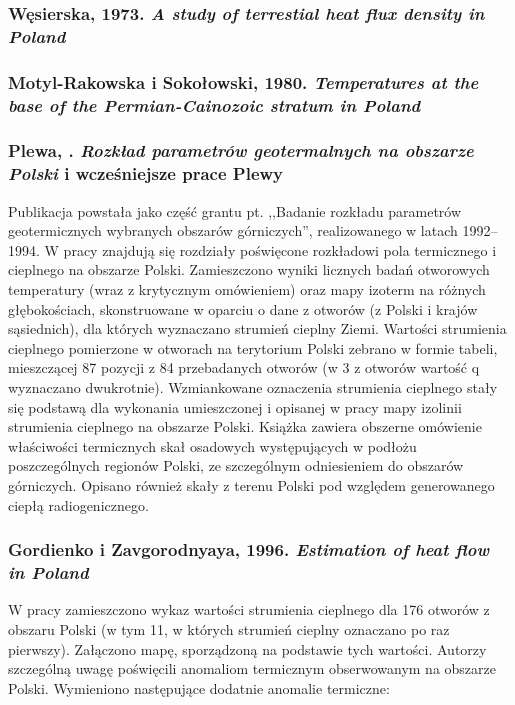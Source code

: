 \documentclass[11.5pt,twoside]{report}
\begin{document}
\subsubsection{Węsierska, 1973. \textit{A study of terrestial heat flux density in Poland}} 

\subsubsection{Motyl-Rakowska i Sokołowski, 1980. \textit{Temperatures at the base of the Permian-Cainozoic stratum in Poland}}

\subsubsection{Plewa, \citeyear{Plewa.1994}. \textit{Rozkład parametrów geotermalnych na obszarze Polski} i wcześniejsze prace Plewy}

Publikacja powstała jako część grantu pt. ,,Badanie rozkładu parametrów geotermicznych wybranych obszarów górniczych'', realizowanego w latach 1992--1994. W pracy znajdują się rozdziały poświęcone rozkładowi pola termicznego i cieplnego na obszarze Polski. Zamieszczono wyniki licznych badań otworowych temperatury (wraz z krytycznym omówieniem) oraz mapy izoterm na różnych głębokościach, skonstruowane w oparciu o dane z otworów (z Polski i krajów sąsiednich), dla których wyznaczano strumień cieplny Ziemi. Wartości strumienia cieplnego pomierzone w otworach na terytorium Polski zebrano w formie tabeli, mieszczącej 87 pozycji z 84 przebadanych otworów (w 3 z otworów wartość q wyznaczano dwukrotnie). Wzmiankowane oznaczenia strumienia cieplnego stały się podstawą dla wykonania umieszczonej i opisanej w pracy mapy izolinii strumienia cieplnego na obszarze Polski. Książka zawiera obszerne omówienie właściwości termicznych skał osadowych występujących w podłożu poszczególnych regionów Polski, ze szczególnym odniesieniem do obszarów górniczych. Opisano również skały z terenu Polski pod względem generowanego ciepłą radiogenicznego.

\subsubsection{Gordienko i Zavgorodnyaya, 1996. \textit{Estimation of heat flow in Poland}}

W pracy zamieszczono wykaz wartości strumienia cieplnego dla 176 otworów z obszaru Polski (w tym 11, w których strumień cieplny oznaczano po raz pierwszy). Załączono mapę, sporządzoną na podstawie tych wartości. Autorzy szczególną uwagę poświęcili anomaliom termicznym obserwowanym na obszarze Polski. Wymieniono następujące dodatnie anomalie termiczne:
\end{document}
